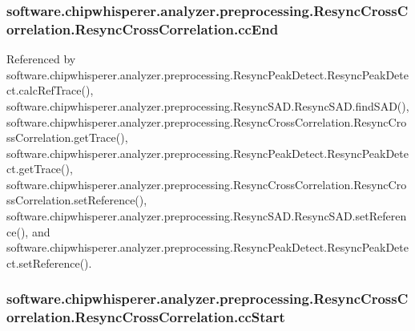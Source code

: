\subsubsection[{cc\+End}]{\setlength{\rightskip}{0pt plus 5cm}software.\+chipwhisperer.\+analyzer.\+preprocessing.\+Resync\+Cross\+Correlation.\+Resync\+Cross\+Correlation.\+cc\+End}\label{classsoftware_1_1chipwhisperer_1_1analyzer_1_1preprocessing_1_1ResyncCrossCorrelation_1_1ResyncCrossCorrelation_aa769c0472faa96b6f26789f71fe5d06f}


Referenced by software.\+chipwhisperer.\+analyzer.\+preprocessing.\+Resync\+Peak\+Detect.\+Resync\+Peak\+Detect.\+calc\+Ref\+Trace(), software.\+chipwhisperer.\+analyzer.\+preprocessing.\+Resync\+S\+A\+D.\+Resync\+S\+A\+D.\+find\+S\+A\+D(), software.\+chipwhisperer.\+analyzer.\+preprocessing.\+Resync\+Cross\+Correlation.\+Resync\+Cross\+Correlation.\+get\+Trace(), software.\+chipwhisperer.\+analyzer.\+preprocessing.\+Resync\+Peak\+Detect.\+Resync\+Peak\+Detect.\+get\+Trace(), software.\+chipwhisperer.\+analyzer.\+preprocessing.\+Resync\+Cross\+Correlation.\+Resync\+Cross\+Correlation.\+set\+Reference(), software.\+chipwhisperer.\+analyzer.\+preprocessing.\+Resync\+S\+A\+D.\+Resync\+S\+A\+D.\+set\+Reference(), and software.\+chipwhisperer.\+analyzer.\+preprocessing.\+Resync\+Peak\+Detect.\+Resync\+Peak\+Detect.\+set\+Reference().

\hypertarget{classsoftware_1_1chipwhisperer_1_1analyzer_1_1preprocessing_1_1ResyncCrossCorrelation_1_1ResyncCrossCorrelation_a32ed170b0bee2aa337df895c937055db}{}
\subsubsection[{cc\+Start}]{\setlength{\rightskip}{0pt plus 5cm}software.\+chipwhisperer.\+analyzer.\+preprocessing.\+Resync\+Cross\+Correlation.\+Resync\+Cross\+Correlation.\+cc\+Start}\label{classsoftware_1_1chipwhisperer_1_1analyzer_1_1preprocessing_1_1ResyncCrossCorrelation_1_1ResyncCrossCorrelation_a32ed170b0bee2aa337df895c937055db}


